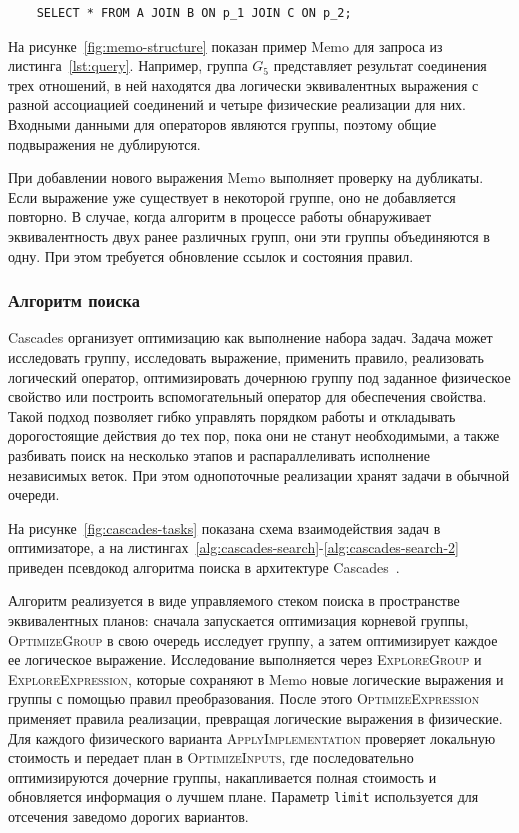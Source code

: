 \documentclass[14pt, russian]{scrartcl}
\begin{document}
\begin{listing}
  \caption{Пример запроса.}
  \label{lst:query}
  \begin{verbatim}
    SELECT * FROM A JOIN B ON p_1 JOIN C ON p_2;
  \end{verbatim}
\end{listing}

На рисунке~\ref{fig:memo-structure} показан пример Memo для запроса из
листинга~\ref{lst:query}. Например, группа \(G_5\) представляет результат
соединения трех отношений, в ней находятся два логически эквивалентных выражения
с разной ассоциацией соединений и четыре физические реализации для них. Входными
данными для операторов являются группы, поэтому общие подвыражения не
дублируются.

При добавлении нового выражения Memo выполняет проверку на дубликаты. Если
выражение уже существует в некоторой группе, оно не добавляется повторно. В
случае, когда алгоритм в процессе работы обнаруживает эквивалентность двух ранее
различных групп, они эти группы объединяются в одну. При этом требуется
обновление ссылок и состояния правил.

\subsubsection{Алгоритм поиска}

Cascades организует оптимизацию как выполнение набора задач. Задача может
исследовать группу, исследовать выражение, применить правило, реализовать
логический оператор, оптимизировать дочернюю группу под заданное физическое
свойство или построить вспомогательный оператор для обеспечения свойства. Такой
подход позволяет гибко управлять порядком работы и откладывать дорогостоящие
действия до тех пор, пока они не станут необходимыми, а также разбивать поиск на
несколько этапов и распараллеливать исполнение независимых веток. При этом
однопоточные реализации хранят задачи в обычной очереди.

На рисунке~\ref{fig:cascades-tasks} показана схема взаимодействия задач в
оптимизаторе, а на
листингах~\ref{alg:cascades-search}-\ref{alg:cascades-search-2} приведен
псевдокод алгоритма поиска в архитектуре Cascades~\cite{DingNarasayya2024}.

Алгоритм реализуется в виде управляемого стеком поиска в пространстве
эквивалентных планов: сначала запускается оптимизация корневой группы,
\textsc{OptimizeGroup} в свою очередь исследует группу, а затем оптимизирует
каждое ее логическое выражение. Исследование выполняется через
\textsc{ExploreGroup} и \textsc{ExploreExpression}, которые сохраняют в Memo
новые логические выражения и группы с помощью правил преобразования. После этого
\textsc{OptimizeExpression} применяет правила реализации, превращая логические
выражения в физические. Для каждого физического варианта
\textsc{ApplyImplementation} проверяет локальную стоимость и передает план в
\textsc{OptimizeInputs}, где последовательно оптимизируются дочерние группы,
накапливается полная стоимость и обновляется информация о лучшем плане. Параметр
\texttt{limit} используется для отсечения заведомо дорогих вариантов.
\end{document}
